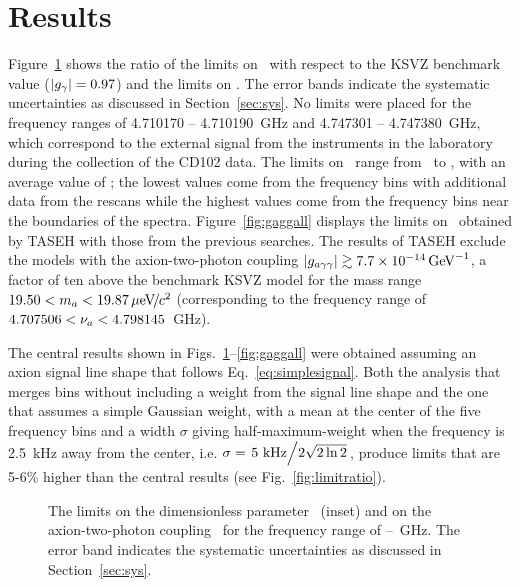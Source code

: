 \newpage
\section{Results} \label{sec:results}
Figure~\ref{fig:glimit} shows the ratio of the limits on \ggamma\ with respect 
to the KSVZ benchmark value ($\left|g_{\gamma}\right|=0.97$) and the limits on \gagg. 
The error bands indicate the systematic uncertainties as discussed in 
Section~\ref{sec:sys}. No limits were placed for the frequency ranges of 
4.710170 -- 4.710190~GHz and 4.747301 -- 4.747380~GHz, 
which correspond to the external signal from the instruments in the 
laboratory during the collection of the CD102 data. 
The limits on \gagg\ range from \lolimit\ to \hilimit, with an average 
value of \avelimit; the lowest values come from the frequency bins with 
additional data from the rescans while the highest values come from the 
frequency bins near the boundaries of the spectra. 
Figure~\ref{fig:gaggall} displays 
the limits on \gagg\ obtained by TASEH with those from the previous searches. 
The results of TASEH exclude the models with the axion-two-photon
coupling $\left|g_{a\gamma\gamma}\right|\gtrsim 7.7\times 10^{-14}\,\text{Ge\hspace{-.08em}V}^{-1}$, a factor of ten above the benchmark
KSVZ model for the mass range $19.50 < m_a < 19.87 \,\mu\text{e\hspace{-.08em}V\hspace{-0.16em}/\hspace{-0.08em}}c^2$ (corresponding to 
the frequency range of $4.707506 < \nu_a < 4.798145$~GHz). 

The central results shown in Figs.~\ref{fig:glimit}--\ref{fig:gaggall} were 
obtained assuming an axion signal line shape that follows 
Eq.~\ref{eq:simplesignal}. Both the analysis that merges bins without including
 a weight from the signal line shape and the one 
that assumes a simple Gaussian weight, with a mean at the center of the five 
frequency bins and a width $\sigma$ 
giving half-maximum-weight when the frequency 
is 2.5~kHz away from the center, i.e. 
$\sigma=\left.5~\text{kHz}\middle/2\sqrt{2\ln2}\right.$, produce limits that 
are 5-6\% higher than the central results (see Fig.~\ref{fig:limitratio}). 

\begin{figure} [htbp]
  \centering
  \caption{The limits on the dimensionless parameter \ggamma\ (inset) and 
 on the axion-two-photon coupling \gagg\  for the 
frequency range of \flo--\fhi~GHz. The error band indicates the systematic 
  uncertainties as discussed in Section~\ref{sec:sys}. }
  \label{fig:glimit}
\end{figure}

